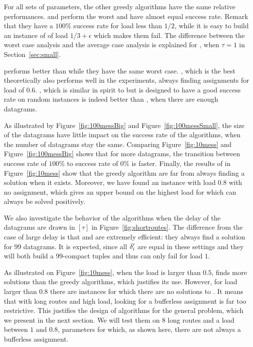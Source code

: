 For all sets of parameters, the other greedy algorithms have the same relative performances. \metaoffset and \greedyuniform
perform the worst and have almost equal success rate. Remark that they have a $100\%$ success rate for load
less than $1/2$, while it is easy to build an instance of \pma of load $1/3 +\epsilon$ which makes them fail. 
The difference between the worst case analysis and the average case analysis is explained for \greedyuniform, when $\tau = 1$ in Section~\ref{sec:small}.

\firstfit performs better than \metaoffset while they have the same worst case. \compactpair, which is the best theoretically also performs well in the experiments, always finding assignments for load of $0.6$.  \compactfit, which is similar in spirit to \compactpair but is designed to have a good success rate on random instances is indeed better than  \compactpair, when there are enough datagrams.

As illustrated by Figure~\ref{fig:100messBig} and Figure~\ref{fig:100messSmall}, the size of the datagrams have little impact on the success rate of the algorithms, when the number of datagrams stay the same. Comparing Figure~\ref{fig:10mess} and Figure~\ref{fig:100messBig} shows that for more datagrams, the transition between success rate of $100\%$ to success rate of $0\%$ is faster.
Finally, the results of \ESCA in Figure~\ref{fig:10mess} show that the greedy algorithm are far from always finding a solution when it exists. Moreover, we have found an instance with load $0.8$ with no assignment, which gives an upper bound on the highest load for which \pma can always be solved positively.

We also investigate the behavior of the algorithms when the delay of the datagrams are drawn in $[\tau]$ in 
Figure~\ref{fig:shortroutes}. The difference from the case of large delay is that \compactpair and \compactfit are extremely efficient: they always find a solution for $99$ datagrams. It is expected, since all $\delta'_i$ are equal in these settings and they will both build a $99$-compact tuples and thus can only fail for load $1$.


       As illustrated on Figure~\ref{fig:10mess}, when the load is larger than $0.5$, \ESCA finds more solutions than the greedy algorithms, which justifies its use. However, for load larger than $0.8$ there are instances for which there are no solutions to \pma. It means that with long routes and high load, looking for a bufferless assignment is far too restrictive. This justifies the design of algorithms for the general \pall problem, which we present in the next section. We will test them on $8$ long routes and a load between $1$ and $0.8$, parameters for which, as shown here, there are not always a bufferless assignment.
      
